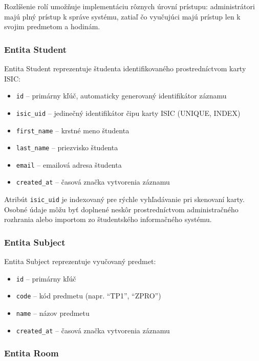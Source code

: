Rozlíšenie rolí umožňuje implementáciu rôznych úrovní prístupu: administrátori majú plný prístup k správe systému, zatiaľ čo vyučujúci majú prístup len k svojim predmetom a hodinám.

\subsubsection{Entita Student}

Entita Student reprezentuje študenta identifikovaného prostredníctvom karty ISIC:

\begin{itemize}
    \item \texttt{id} -- primárny kľúč, automaticky generovaný identifikátor záznamu
    \item \texttt{isic\_uid} -- jedinečný identifikátor čipu karty ISIC (UNIQUE, INDEX)
    \item \texttt{first\_name} -- krstné meno študenta
    \item \texttt{last\_name} -- priezvisko študenta
    \item \texttt{email} -- emailová adresa študenta
    \item \texttt{created\_at} -- časová značka vytvorenia záznamu
\end{itemize}

Atribút \texttt{isic\_uid} je indexovaný pre rýchle vyhľadávanie pri skenovaní karty. Osobné údaje môžu byť doplnené neskôr prostredníctvom administračného rozhrania alebo importom zo študentského informačného systému.

\subsubsection{Entita Subject}

Entita Subject reprezentuje vyučovaný predmet:

\begin{itemize}
    \item \texttt{id} -- primárny kľúč
    \item \texttt{code} -- kód predmetu (napr. ``TP1'', ``ZPRO'')
    \item \texttt{name} -- názov predmetu
    \item \texttt{created\_at} -- časová značka vytvorenia záznamu
\end{itemize}

\subsubsection{Entita Room}

